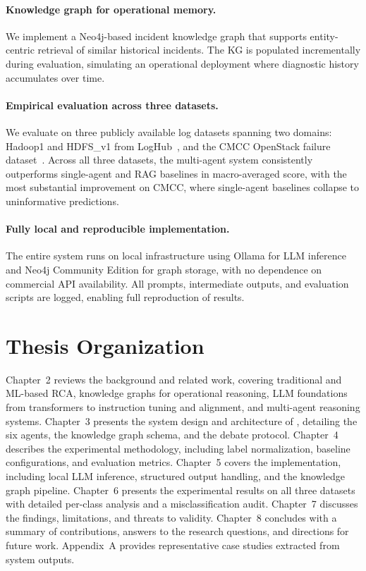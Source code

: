 \paragraph{Knowledge graph for operational memory.}
We implement a Neo4j-based incident knowledge graph that supports entity-centric retrieval of
similar historical incidents. The KG is populated incrementally during evaluation, simulating
an operational deployment where diagnostic history accumulates over time.

\paragraph{Empirical evaluation across three datasets.}
We evaluate \systemname{} on three publicly available log datasets spanning two domains:
Hadoop1 and HDFS\_v1 from LogHub~\cite{he2020loghub}, and the CMCC OpenStack failure
dataset~\cite{cui2025aetherlog}. Across all three datasets, the multi-agent system consistently
outperforms single-agent and RAG baselines in macro-averaged \fone{} score, with the most
substantial improvement on CMCC, where single-agent baselines collapse to uninformative
predictions.

\paragraph{Fully local and reproducible implementation.}
The entire system runs on local infrastructure using Ollama for LLM inference and Neo4j Community
Edition for graph storage, with no dependence on commercial API availability. All prompts,
intermediate outputs, and evaluation scripts are logged, enabling full reproduction of results.

\section{Thesis Organization}

Chapter~2 reviews the background and related work, covering traditional and ML-based RCA,
knowledge graphs for operational reasoning, LLM foundations from transformers to instruction
tuning and alignment, and multi-agent reasoning systems. Chapter~3 presents the system design
and architecture of \systemname{}, detailing the six agents, the knowledge graph schema, and the
debate protocol. Chapter~4 describes the experimental methodology, including label normalization,
baseline configurations, and evaluation metrics. Chapter~5 covers the implementation, including
local LLM inference, structured output handling, and the knowledge graph pipeline.
Chapter~6 presents the experimental results on all three datasets with detailed per-class
analysis and a misclassification audit. Chapter~7 discusses the findings, limitations, and threats
to validity. Chapter~8 concludes with a summary of contributions, answers to the research
questions, and directions for future work. Appendix~A provides representative case studies
extracted from system outputs.
